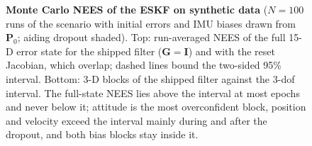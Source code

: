 \begin{figure}[t]
  \caption{\textbf{Monte Carlo NEES of the ESKF on synthetic data} ($N=100$ runs of the  scenario with initial errors and IMU biases drawn from $\mathbf{P}_0$; aiding dropout shaded). Top: run-averaged NEES of the full 15-D error state for the shipped filter ($\mathbf{G}=\mathbf{I}$) and with the reset Jacobian, which overlap; dashed lines bound the two-sided 95\% interval. Bottom: 3-D blocks of the shipped filter against the 3-dof interval. The full-state NEES lies above the interval at most epochs and never below it; attitude is the most overconfident block, position and velocity exceed the interval mainly during and after the dropout, and both bias blocks stay inside it.}
  \label{fig:nees}
\end{figure}
